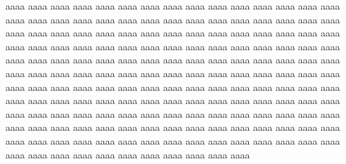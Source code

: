 \documentclass[10pt,dvipdfmx,landscape]{jsarticle}
\begin{document}
aaaa aaaa aaaa aaaa aaaa aaaa aaaa aaaa aaaa aaaa aaaa 
aaaa aaaa aaaa aaaa aaaa aaaa aaaa aaaa aaaa aaaa aaaa 
aaaa aaaa aaaa aaaa aaaa aaaa aaaa aaaa aaaa aaaa aaaa 
aaaa aaaa aaaa aaaa aaaa aaaa aaaa aaaa aaaa aaaa aaaa 
aaaa aaaa aaaa aaaa aaaa aaaa aaaa aaaa aaaa aaaa aaaa 
aaaa aaaa aaaa aaaa aaaa aaaa aaaa aaaa aaaa aaaa aaaa 
aaaa aaaa aaaa aaaa aaaa aaaa aaaa aaaa aaaa aaaa aaaa 
aaaa aaaa aaaa aaaa aaaa aaaa aaaa aaaa aaaa aaaa aaaa 
aaaa aaaa aaaa aaaa aaaa aaaa aaaa aaaa aaaa aaaa aaaa 
aaaa aaaa aaaa aaaa aaaa aaaa aaaa aaaa aaaa aaaa aaaa 
aaaa aaaa aaaa aaaa aaaa aaaa aaaa aaaa aaaa aaaa aaaa 
aaaa aaaa aaaa aaaa aaaa aaaa aaaa aaaa aaaa aaaa aaaa 
aaaa aaaa aaaa aaaa aaaa aaaa aaaa aaaa aaaa aaaa aaaa 
aaaa aaaa aaaa aaaa aaaa aaaa aaaa aaaa aaaa aaaa aaaa 
aaaa aaaa aaaa aaaa aaaa aaaa aaaa aaaa aaaa aaaa aaaa 
aaaa aaaa aaaa aaaa aaaa aaaa aaaa aaaa aaaa aaaa aaaa 
\end{document}

